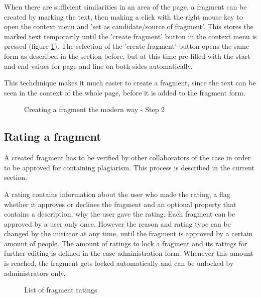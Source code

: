 When there are sufficient similarities in an area of the page, a fragment can be created by marking the text, then making a click with the right mouse key to open the context menu and 'set as candidate/source of fragment'. This stores the marked text temporarily until the 'create fragment' button in the context menu is pressed  (figure \ref{fig:creating-fragment-modern-way-2}). The selection of the 'create fragment' button opens the same form as described in the section before, but at this time pre-filled with the start and end values for page and line on both sides automatically.

This techchnique makes it much easier to create a fragment, since the text can be seen in the context of the whole page, before it is added to the fragment form.

\begin{figure}[!h]
  \centering
  \caption{Creating a fragment the modern way - Step 2}
  \label{fig:creating-fragment-modern-way-2}
\end{figure}

\subsection{Rating a fragment}

A created fragment has to be verified by other collaborators of the case in order to be approved for containing plagiarism. This process is described in the current section.

A rating contains information about the user who made the rating, a flag whether it approves or declines the fragment and an optional property that contains a description, why the user gave the rating. Each fragment can be approved by a user only once. However the reason and rating type can be changed by the initiator at any time, until the fragment is approved by a certain amount of people. The amount of ratings to lock a fragment and its ratings for further editing is defined in the case administration form. Whenever this amount is reached, the fragment gets locked automatically and can be unlocked by administrators only.

\begin{figure}[!h]
  \centering
  \caption{List of fragment ratings}
  \label{fig:feature-single-rating}
\end{figure}